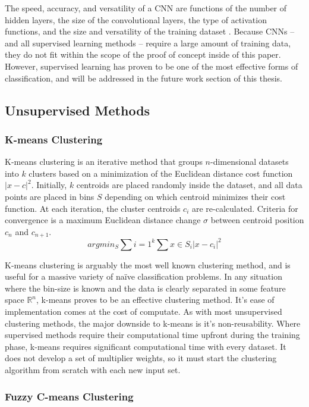 \documentclass[12pt]{drexelthesis}
\let\Oldsubsection\subsection
\renewcommand{\subsection}{\FloatBarrier\Oldsubsection}
\let\Oldsubsubsection\subsubsection
\renewcommand{\subsubsection}{\FloatBarrier\Oldsubsubsection}
\begin{document}
The speed, accuracy, and versatility of a CNN are functions of the number of hidden layers, the size of the convolutional layers, the type of activation functions, and the size and versatility of the training dataset \cite{RN7}. Because CNNs -- and all supervised learning methods -- require a large amount of training data, they do not fit within the scope of the proof of concept inside of this paper. However, supervised learning has proven to be one of the most effective forms of classification, and will be addressed in the future work section of this thesis.

\subsection{Unsupervised Methods}

\subsubsection{K-means Clustering}
K-means clustering is an iterative method that groups $n$-dimensional datasets into $k$ clusters based on a minimization of the Euclidean distance cost function $|x-c|^{2}$. Initially, $k$ centroids are placed randomly inside the dataset, and all data points are placed in bins $S$ depending on which centroid minimizes their cost function. At each iteration, the cluster centroids $c_{i}$ are re-calculated. Criteria for convergence is a maximum Euclidean distance change $\sigma$ between centroid position $c_{n}$ and $c_{n+1}$.
\begin{equation}
	arg min_{S} \sum{i=1}^{k} \sum{x \in S_{i}} |x - c_{i}|^{2}
\end{equation}

K-means clustering is arguably the most well known clustering method, and is useful for a massive variety of naïve classification problems. In any situation where the bin-size is known and the data is clearly separated in some feature space $\mathbb{R}^{n}$, k-means proves to be an effective clustering method. It's ease of implementation comes at the cost of computate. As with most unsupervised clustering methods, the major downside to k-means is it's non-reusability. Where supervised methods require their computational time upfront during the training phase, k-means requires significant computational time with every dataset. It does not develop a set of multiplier weights, so it must start the clustering algorithm from scratch with each new input set.

\subsubsection{Fuzzy C-means Clustering}
\end{document}
